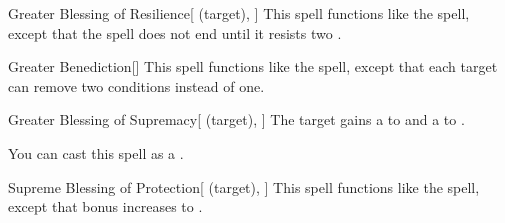 \lowercase{\hypertarget{spell:Greater Blessing of Resilience}{}}\label{spell:Greater Blessing of Resilience}
\begin{attuneability}[\nth{6}]{\hypertarget{spell:Greater Blessing of Resilience}{Greater Blessing of Resilience}}[ (target), ]
This spell functions like the  spell, except that the spell does not end until it resists two .
\end{attuneability}
\vspace{0.25em}



\lowercase{\hypertarget{spell:Greater Benediction}{}}\label{spell:Greater Benediction}
\begin{freeability}[\nth{7}]{\hypertarget{spell:Greater Benediction}{Greater Benediction}}[]
This spell functions like the  spell, except that each target can remove two conditions instead of one.
\end{freeability}
\vspace{0.25em}



\lowercase{\hypertarget{spell:Greater Blessing of Supremacy}{}}\label{spell:Greater Blessing of Supremacy}
\begin{attuneability}[\nth{7}]{\hypertarget{spell:Greater Blessing of Supremacy}{Greater Blessing of Supremacy}}[ (target), ]
The target gains a   to  and a   to .

You can cast this spell as a .
\end{attuneability}
\vspace{0.25em}



\lowercase{\hypertarget{spell:Supreme Blessing of Protection}{}}\label{spell:Supreme Blessing of Protection}
\begin{attuneability}[\nth{7}]{\hypertarget{spell:Supreme Blessing of Protection}{Supreme Blessing of Protection}}[ (target), ]
This spell functions like the  spell, except that bonus increases to .
\end{attuneability}
\vspace{0.25em}



